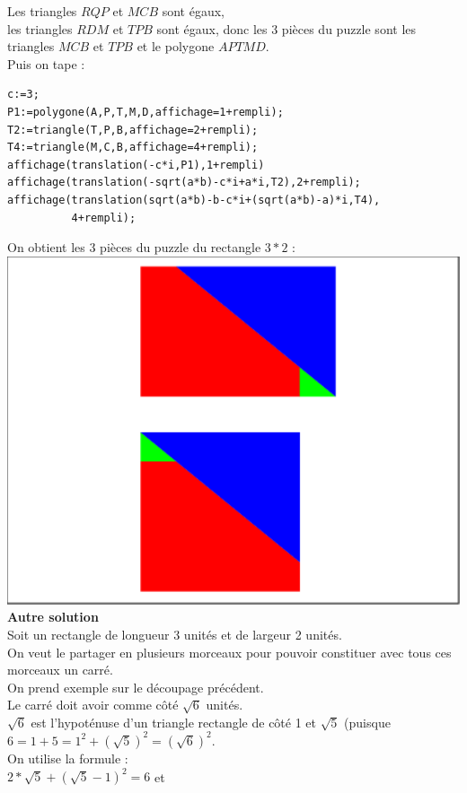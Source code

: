 \documentclass[a4paper,11pt]{book}
\begin{document}
Les triangles $RQP$ et $MCB$ sont \'egaux,\\ 
les triangles $RDM$ et $TPB$ sont \'egaux,
donc les 3 pi\`eces du puzzle sont les triangles $MCB$ et $TPB$ et le polygone
$APTMD$.\\
Puis on tape :
\begin{verbatim}
c:=3;
P1:=polygone(A,P,T,M,D,affichage=1+rempli);
T2:=triangle(T,P,B,affichage=2+rempli);
T4:=triangle(M,C,B,affichage=4+rempli);
affichage(translation(-c*i,P1),1+rempli)
affichage(translation(-sqrt(a*b)-c*i+a*i,T2),2+rempli);
affichage(translation(sqrt(a*b)-b-c*i+(sqrt(a*b)-a)*i,T4),
          4+rempli);
\end{verbatim}
On obtient les 3 pi\`eces du puzzle du rectangle $3*2$ :\\
\includegraphics[width=\textwidth]{carresqrt23}\\
{\bf Autre solution}\\
Soit un rectangle de longueur 3 unit\'es et de largeur 2 unit\'es.\\
On veut le partager en plusieurs morceaux pour pouvoir constituer avec 
tous ces morceaux un carr\'e.\\
On prend exemple sur le d\'ecoupage pr\'ec\'edent.\\
Le carr\'e doit avoir comme c\^ot\'e $\sqrt 6$ unit\'es.\\
$\sqrt 6$ est l'hypot\'enuse d'un triangle rectangle de c\^ot\'e 1 et 
$\sqrt 5$ (puisque $6=1+5=1^2+(\sqrt 5)^2=(\sqrt 6)^2$.\\
On utilise la formule :\\
$2*\sqrt 5+(\sqrt 5-1)^2=6$ et\\
\end{document}

